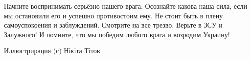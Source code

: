 Начните воспринимать серьёзно нашего врага. Осознайте какова наша сила, если мы
остановили его и успешно противостоим ему. Не стоит быть в плену самоуспокоения
и заблуждений. Смотрите на все трезво. Верьте в ЗСУ и Залужного! И помните, что
мы победим любого врага и возродим Украину!

Иллюстрирация (с) Нікіта Тітов
